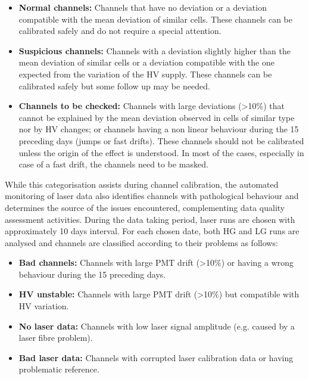 \begin{itemize}
  \item \textbf{Normal channels:} Channels that have no deviation or a deviation compatible with the mean deviation of similar cells. These channels can be calibrated safely and do not require a special attention.
  \item \textbf{Suspicious channels:} Channels with a deviation slightly higher than the mean deviation of similar cells or a deviation compatible with the one expected from the variation of the HV supply. These channels can be calibrated safely but some follow up may be needed.
    \item \textbf{Channels to be checked:} Channels with large deviations (>10\%) that cannot be explained by the mean deviation observed in cells of similar type nor by HV changes; or channels having a non linear behaviour during the 15 preceding days (jumps or fast drifts). These channels should not be calibrated unless the origin of the effect is understood. In most of the cases, especially in case of a fast drift, the channels need to be masked.
\end{itemize}


While this categorisation assists during channel calibration, the automated monitoring of laser data also identifies channels with pathological behaviour and determines the source of the issues encountered, complementing data quality assessment activities. During the data taking period, laser runs are chosen with approximately 10 days interval. For each chosen date, both HG and LG runs are analysed and channels are classified according to their problems as follows:

\begin{itemize}
  \item \textbf{Bad channels:} Channels with large PMT drift (>10\%) or having a wrong behaviour during the 15 preceding days.
  \item \textbf{HV unstable:} Channels with large PMT drift (>10\%) but compatible with HV variation.
  \item \textbf{No laser data:} Channels with low laser signal amplitude (e.g. caused by a laser fibre problem).
  \item \textbf{Bad laser data:} Channels with corrupted laser calibration data or having problematic reference.
\end{itemize}

